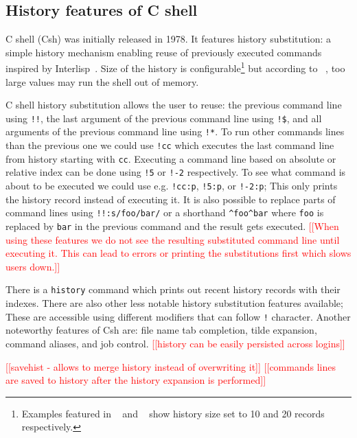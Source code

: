 \documentclass[thesis=M,english]{FITthesis}[2012/10/20]
\newcommand{\redtext}[1]{\textcolor{red}{[[#1]]}}
\let\myCite\cite
\renewcommand\cite{\unskip~\myCite}
\begin{document}
\subsection{History features of C shell}

C shell (Csh) was initially released in 1978. 
It features history substitution: a simple history mechanism enabling reuse of previously executed commands inspired by Interlisp\cite{joy1994cshintroduction}. Size of the history is configurable\footnote{Examples featured in \cite{joy1994cshintroduction} and \cite{dubois1995tcshusing}
show history size set to 10 and 20 records respectively.} but according to \cite{cshman}, too large values may run the shell out of memory.


C shell history substitution allows the user to reuse: the previous command line using \verb|!!|, the last argument of the previous command line using \verb|!$|, and all arguments of the previous command line using \verb|!*|. To run other commands lines than the previous one we could use \verb|!cc| which executes the last command line from history starting with \verb|cc|. Executing a command line based on absolute or relative index can be done using \verb|!5| or \verb|!-2| respectively. To see what command is about to be executed we could use e.g. \verb|!cc:p|, \verb|!5:p|, or \verb|!-2:p|; This only prints the history record instead of executing it. It is also possible to replace parts of command lines using \verb|!!:s/foo/bar/| or a shorthand \verb|^foo^bar| where \verb|foo| is replaced by \verb|bar| in the previous command and the result gets executed. \redtext{When using these features we do not see the resulting substituted command line until executing it. This can lead to errors or printing the substitutions first which slows users down.}
    
There is a \verb|history| command which prints out recent history records with their indexes. There are also other less notable history substitution features available; These are accessible using different modifiers that can follow \verb|!| character. Another noteworthy features of Csh are: file name tab completion, tilde expansion, command aliases, and job control. \redtext{history can be easily persisted across logins}

\redtext{savehist - allows to merge history instead of overwriting it}
\redtext{commands lines are saved to history after the history expansion is performed}
\end{document}
